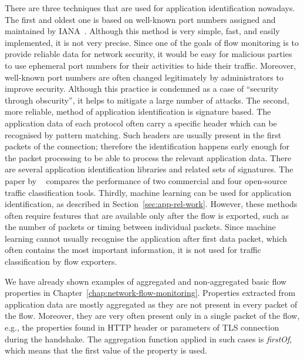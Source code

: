 There are three techniques that are used for application identification nowadays. The first and oldest one is based on well-known port numbers assigned and maintained by IANA~\cite{IANA-2017-Service}. Although this method is very simple, fast, and easily implemented, it is not very precise. Since one of the goals of flow monitoring is to provide reliable data for network security, it would be easy for malicious parties to use ephemeral port numbers for their activities to hide their traffic. Moreover, well-known port numbers are often changed legitimately by administrators to improve security. Although this practice is condemned as a case of ``security through obscurity'', it helps to mitigate a large number of attacks. The second, more reliable, method of application identification is signature based. The application data of each protocol often carry a specific header which can be recognised by pattern matching. Such headers are usually present in the first packets of the connection; therefore the identification happens early enough for the packet processing to be able to process the relevant application data. There are several application identification libraries and related sets of signatures. The paper by \citeauthor{Bujlow-2015-classification}~\cite{Bujlow-2015-classification} compares the performance of two commercial and four open-source traffic classification tools. Thirdly, machine learning can be used for application identification, as described in Section~\ref{sec:app-rel-work}. However, these methods often require features that are available only after the flow is exported, such as the number of packets or timing between individual packets. Since machine learning cannot usually recognise the application after first data packet, which often contains the most important information, it is not used for traffic classification by flow exporters.

We have already shown examples of aggregated and non-aggregated basic flow properties in Chapter~\ref{chap:network-flow-monitoring}. Properties extracted from application data are mostly aggregated as they are not present in every packet of the flow. Moreover, they are very often present only in a single packet of the flow, e.g., the properties found in HTTP header or parameters of TLS connection during the handshake. The aggregation function applied in such cases is \emph{firstOf}, which means that the first value of the property is used. 

